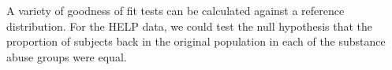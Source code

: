 A variety of goodness of fit tests can be calculated against a reference 
distribution.  For the HELP data, we could test the null hypothesis that the 
proportion of subjects back in the original population in each of the 
substance abuse groups were equal.

\begin{knitrout}
\end{knitrout}

